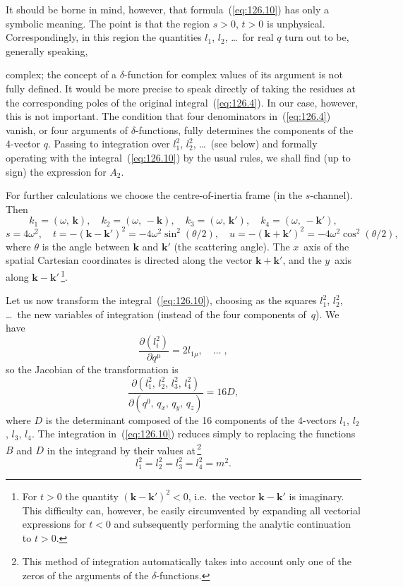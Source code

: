 It should be borne in mind, however, that formula~(\ref{eq:126.10}) has only a symbolic meaning. The point is that the region $s > 0$, $t > 0$ is unphysical. Correspondingly, in this region the quantities $l_1$, $l_2$, \ldots\ for real $q$ turn out to be, generally speaking,


\noindent complex; the concept of a $\delta$-function for complex values of its argument is not fully defined. It would be more precise to speak directly of taking the residues at the corresponding poles of the original integral~(\ref{eq:126.4}). In our case, however, this is not important. The condition that four denominators in~(\ref{eq:126.4}) vanish, or four arguments of $\delta$-functions, fully determines the components of the 4-vector $q$. Passing to integration over $l_1^2$, $l_2^2$, \ldots\ (see below) and formally operating with the integral~(\ref{eq:126.10}) by the usual rules, we shall find (up to sign) the expression for $A_2$.

For further calculations we choose the centre-of-inertia frame (in the $s$-channel). Then
\begin{equation}
k_1 = (\omega,\,\mathbf{k}),\quad k_2 = (\omega,\,-\mathbf{k}),\quad k_3 = (\omega,\,\mathbf{k}'),\quad k_4 = (\omega,\,-\mathbf{k}'),
\label{eq:126.11}
\end{equation}
\begin{equation}
s = 4\omega^2,\quad t = -(\mathbf{k} - \mathbf{k}')^2 = -4\omega^2\sin^2(\theta/2),\quad u = -(\mathbf{k} + \mathbf{k}')^2 = -4\omega^2\cos^2(\theta/2),
\label{eq:126.12}
\end{equation}
where $\theta$ is the angle between $\mathbf{k}$ and $\mathbf{k}'$ (the scattering angle). The $x$~axis of the spatial Cartesian coordinates is directed along the vector $\mathbf{k} + \mathbf{k}'$, and the $y$~axis along $\mathbf{k} - \mathbf{k}'$\,\footnote{For $t > 0$ the quantity $(\mathbf{k} - \mathbf{k}')^2 < 0$, i.e.\ the vector $\mathbf{k} - \mathbf{k}'$ is imaginary. This difficulty can, however, be easily circumvented by expanding all vectorial expressions for $t < 0$ and subsequently performing the analytic continuation to $t > 0$.}.

Let us now transform the integral~(\ref{eq:126.10}), choosing as the squares $l_1^2$, $l_2^2$, \ldots\ the new variables of integration (instead of the four components of~$q$). We have
\[
\frac{\partial(l_i^2)}{\partial q^\mu} = 2l_{1\mu},\quad \ldots\;,
\]
so the Jacobian of the transformation is
\[
\frac{\partial(l_1^2,\,l_2^2,\,l_3^2,\,l_4^2)}{\partial(q^0,\,q_x,\,q_y,\,q_z)} = 16D,
\]
where $D$ is the determinant composed of the 16 components of the 4-vectors $l_1$, $l_2$, $l_3$, $l_4$. The integration in~(\ref{eq:126.10}) reduces simply to replacing the functions $B$ and $D$ in the integrand by their values at\,\footnote{This method of integration automatically takes into account only one of the zeros of the arguments of the $\delta$-functions.}
\begin{equation}
l_1^2 = l_2^2 = l_3^2 = l_4^2 = m^2.
\label{eq:126.13}
\end{equation}

